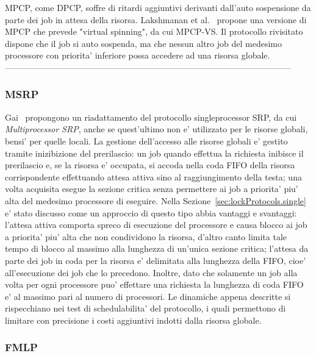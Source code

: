 MPCP, come DPCP, soffre di ritardi aggiuntivi derivanti dall'auto sospensione da parte dei job in attesa della risorsa. Lakshmanan et al.~\cite{5368127} propone una versione di MPCP che prevede "virtual spinning", da cui MPCP-VS. Il protocollo rivisitato dispone che il job si auto sospenda, ma che nessun altro job del medesimo processore con priorita' inferiore possa accedere ad una risorsa globale.\\

-----------------------------------------------------------------------------------------------------

\subsubsection{MSRP}
\label{sec:lockProtocols.msrp}

Gai~\cite{Gai:2003:CMM:827266.828537} propongono un riadattamento del protocollo singleprocessor SRP, da cui \textit{Multiprocessor SRP}, anche se quest'ultimo non e' utilizzato per le risorse globali, bensi' per quelle locali. La gestione dell'accesso alle risorse globali e' gestito tramite inizibizione del prerilascio: un job quando effettua la richiesta inibisce il prerilascio e, se la risorsa e' occupata, si accoda nella coda FIFO della risorsa corrispondente effettuando attesa attiva sino al raggiungimento della testa; una volta acquisita esegue la sezione critica senza permettere ai job a priorita' piu' alta del medesimo processore di eseguire. Nella Sezione~\ref{sec:lockProtocols.single} e' stato discusso come un approccio di questo tipo abbia vantaggi e svantaggi: l'attesa attiva comporta spreco di esecuzione del processore e causa blocco ai job a priorita' piu' alta che non condividono la risorsa, d'altro canto limita tale tempo di blocco al massimo alla lunghezza di un'unica sezione critica; l'attesa da parte dei job in coda per la risorsa e' delimitata alla lunghezza della FIFO, cioe' all'esecuzione dei job che lo precedono. Inoltre, dato che solamente un job alla volta per ogni processore puo' effettare una richiesta la lunghezza di coda FIFO e' al massimo pari al numero di processori. Le dinamiche appena descritte si rispecchiano nei test di schedulabilita' del protocollo, i quali permettono di limitare con precisione i costi aggiuntivi indotti dalla risorsa globale.

\subsubsection{FMLP}
\label{sec:lockProtocols.fmlp}

